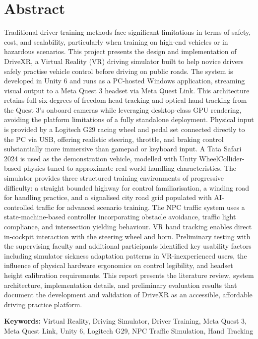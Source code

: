 \chapter*{Abstract}

Traditional driver training methods face significant limitations in terms of safety, cost, and scalability, particularly when training on high-end vehicles or in hazardous scenarios. This project presents the design and implementation of DriveXR, a Virtual Reality (VR) driving simulator built to help novice drivers safely practise vehicle control before driving on public roads. The system is developed in Unity 6 and runs as a PC-hosted Windows application, streaming visual output to a Meta Quest 3 headset via Meta Quest Link. This architecture retains full six-degrees-of-freedom head tracking and optical hand tracking from the Quest 3's onboard cameras while leveraging desktop-class GPU rendering, avoiding the platform limitations of a fully standalone deployment. Physical input is provided by a Logitech G29 racing wheel and pedal set connected directly to the PC via USB, offering realistic steering, throttle, and braking control substantially more immersive than gamepad or keyboard input. A Tata Safari 2024 is used as the demonstration vehicle, modelled with Unity WheelCollider-based physics tuned to approximate real-world handling characteristics. The simulator provides three structured training environments of progressive difficulty: a straight bounded highway for control familiarisation, a winding road for handling practice, and a signalised city road grid populated with AI-controlled traffic for advanced scenario training. The NPC traffic system uses a state-machine-based controller incorporating obstacle avoidance, traffic light compliance, and intersection yielding behaviour. VR hand tracking enables direct in-cockpit interaction with the steering wheel and horn. Preliminary testing with the supervising faculty and additional participants identified key usability factors including simulator sickness adaptation patterns in VR-inexperienced users, the influence of physical hardware ergonomics on control legibility, and headset height calibration requirements. This report presents the literature review, system architecture, implementation details, and preliminary evaluation results that document the development and validation of DriveXR as an accessible, affordable driving practice platform.

\textbf{Keywords:} Virtual Reality, Driving Simulator, Driver Training, Meta Quest 3, Meta Quest Link, Unity 6, Logitech G29, NPC Traffic Simulation, Hand Tracking